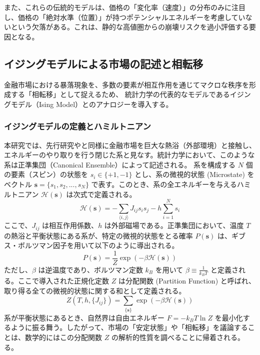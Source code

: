 \documentclass[11pt,a4paper,oneside]{ltjsarticle}
\begin{document}
また、これらの伝統的モデルは、価格の「変化率（速度）」の分布のみに注目し、価格の「絶対水準（位置）」が持つポテンシャルエネルギーを考慮していないという欠落がある。これは、静的な高値圏からの崩壊リスクを過小評価する要因となる。



\subsection{イジングモデルによる市場の記述と相転移}
金融市場における暴落現象を、多数の要素が相互作用を通じてマクロな秩序を形成する「相転移」として捉えるため、
統計力学の代表的なモデルであるイジングモデル（Ising Model）とのアナロジーを導入する。


\subsubsection{イジングモデルの定義とハミルトニアン}
本研究では、先行研究\cite{cite:11}や\cite{cite:12}と同様に金融市場を巨大な熱浴（外部環境）と接触し、エネルギーのやり取りを行う閉じた系と見なす。統計力学において、このような系は正準集団（Canonical Ensemble）によって記述される。
系を構成する $N$ 個の要素（スピン）の状態を $s_i \in \{+1, -1\}$ とし、系の微視的状態 (Microstate) をベクトル $\mathbf{s}=\{s_1, s_2, ..., s_N\}$ で表す。このとき、系の全エネルギーを与えるハミルトニアン $\mathcal{H}(\mathbf{s})$ は次式で定義される。
\begin{equation}
\mathcal{H}(\mathbf{s}) = -\sum_{\langle i,j \rangle} J_{ij} s_i s_j - h \sum_{i=1}^{N} s_i
\end{equation}
ここで、$J_{ij}$ は相互作用係数、$h$ は外部磁場である。正準集団において、温度 $T$ の熱浴と平衡状態にある系が、特定の微視的状態をとる確率 $P(\mathbf{s})$ は、ギブス・ボルツマン因子を用いて以下のように導出される。
\begin{equation}
P(\mathbf{s}) = \frac{1}{Z} \exp(-\beta \mathcal{H}(\mathbf{s}))
\end{equation}
ただし、$\beta$ は逆温度であり、ボルツマン定数 $k_B$ を用いて $\beta \equiv \frac{1}{k_B T}$ と定義される。ここで導入された正規化定数 $Z$ は分配関数 (Partition Function) と呼ばれ、取り得る全ての微視的状態に関する和として定義される。
\begin{equation}
Z(T, h, \{J_{ij}\}) = \sum_{\{\mathbf{s}\}} \exp(-\beta \mathcal{H}(\mathbf{s}))
\end{equation}
系が平衡状態にあるとき、自然界は自由エネルギー $F = -k_B T \ln Z$ を最小化するように振る舞う。したがって、市場の「安定状態」や「相転移」を議論することは、数学的にはこの分配関数 $Z$ の解析的性質を調べることに帰着される。る。
\end{document}
